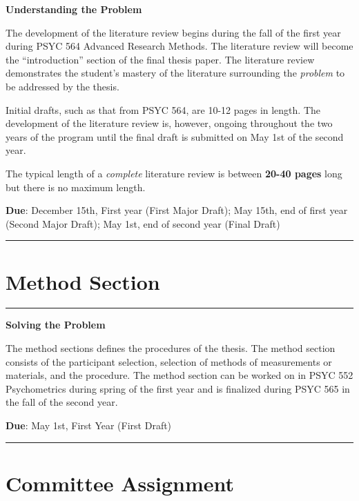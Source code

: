 \documentclass[openany]{book}
\begin{document}
\textbf{Understanding the Problem}

The development of the literature review begins during the fall of the first year during PSYC 564 Advanced Research Methods. The literature review will become the ``introduction'' section of the final thesis paper. The literature review demonstrates the student's mastery of the literature surrounding the \emph{problem} to be addressed by the thesis.

Initial drafts, such as that from PSYC 564, are 10-12 pages in length. The development of the literature review is, however, ongoing throughout the two years of the program until the final draft is submitted on May 1st of the second year.

The typical length of a \emph{complete} literature review is between \textbf{20-40 pages} long but there is no maximum length.

\textbf{Due}: December 15th, First year (First Major Draft); May 15th, end of first year (Second Major Draft); May 1st, end of second year (Final Draft)

\begin{center}\rule{0.5\linewidth}{0.5pt}\end{center}

\hypertarget{method-section}{%
\section{Method Section}\label{method-section}}

\begin{center}\rule{0.5\linewidth}{0.5pt}\end{center}

\textbf{Solving the Problem}

The method sections defines the procedures of the thesis. The method section consists of the participant selection, selection of methods of measurements or materials, and the procedure. The method section can be worked on in PSYC 552 Psychometrics during spring of the first year and is finalized during PSYC 565 in the fall of the second year.

\textbf{Due}: May 1st, First Year (First Draft)

\begin{center}\rule{0.5\linewidth}{0.5pt}\end{center}

\hypertarget{committee-assignment}{%
\section{Committee Assignment}\label{committee-assignment}}
\end{document}
